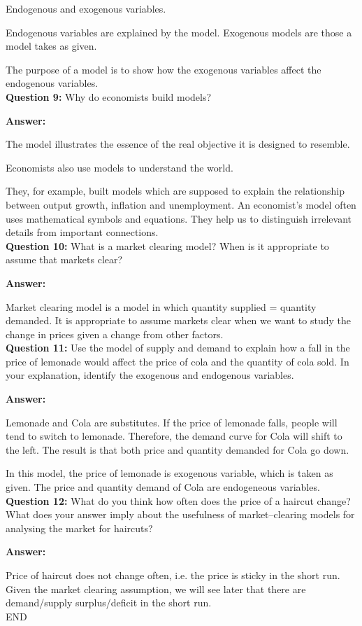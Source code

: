 \documentclass[a4paper]{article}
\begin{document}
Endogenous and exogenous variables.

Endogenous variables are explained by the model. Exogenous models are those a model takes as given.

The purpose of a model is to show how the exogenous variables affect the endogenous variables. \\

\textbf{Question 9:} Why do economists build models? 

\textbf{Answer:} 

The model illustrates the essence of the real objective it is designed to resemble.

Economists also use models to understand the world.

They, for example, built models which are supposed to explain the relationship between output growth, inflation and unemployment. An economist’s model often uses mathematical symbols and equations. They help us to distinguish irrelevant details from important connections. \\

\textbf{Question 10:} What is a market clearing model? When is it appropriate to assume that markets clear? 

\textbf{Answer:} 

Market clearing model is a model in which quantity supplied = quantity demanded. It is appropriate to assume markets clear when we want to study the change in prices given a change from other factors. \\

\textbf{Question 11:} Use the model of supply and demand to explain how a fall in the price of lemonade would affect the price of cola and the quantity of cola sold. In your explanation, identify the exogenous and endogenous variables. 

\textbf{Answer:} 

Lemonade and Cola are substitutes. If the price of lemonade falls, people will tend to switch to lemonade. Therefore, the demand curve for Cola will shift to the left. The result is that both price and quantity demanded for Cola go down.

In this model, the price of lemonade is exogenous variable, which is taken as given. The price and quantity demand of Cola are endogeneous variables. \\

\textbf{Question 12:} What do you think how often does the price of a haircut change? What does your answer imply about the usefulness of market--clearing models for analysing the market for haircuts? 

\textbf{Answer:} 

Price of haircut does not change often, i.e. the price is sticky in the short run. Given the market clearing assumption, we will see later that there are demand/supply surplus/deficit in the short run. \\

\centering
END
\end{document}
